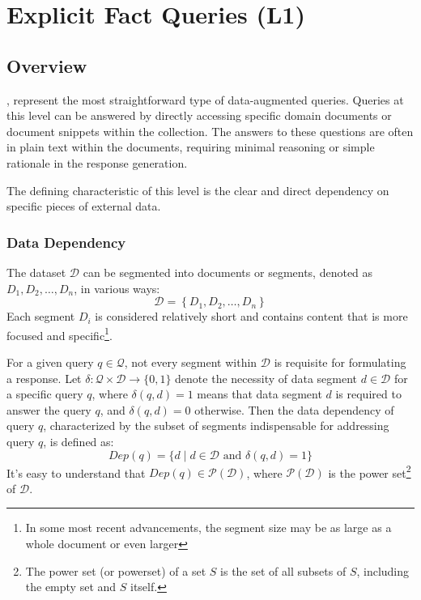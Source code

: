 \section{Explicit Fact Queries (L1)}

\subsection{Overview}

\MFUsentencecase{\firstlevel}, represent the most straightforward type of data-augmented queries. Queries at this level can be answered by directly accessing specific domain documents or document snippets within the collection. The answers to these questions are often in plain text within the documents, requiring minimal reasoning or simple rationale in the response generation.


The defining characteristic of this level is the clear and direct dependency on specific pieces of external data. 

\subsubsection{Data Dependency}

The dataset $\mathcal{D}$ can be segmented into documents or segments, denoted as $D_1, D_2, \ldots, D_n$, in various ways:
\begin{equation}
    \mathcal{D} = \left\{ D_1, D_2, \ldots, D_n \right\}
\end{equation}
Each segment $D_i$ is considered relatively short and contains content that is more focused and specific\footnote{In some most recent advancements, the segment size may be as large as a whole document or even larger}. 

For a given query \(q \in \mathcal{Q}\), not every segment within $\mathcal{D}$ is requisite for formulating a response. Let $\delta: \mathcal{Q} \times \mathcal{D} \rightarrow \{0,1\}$ denote the necessity of data segment \(d \in \mathcal{D}\) for a specific query \(q\), where $\delta(q,d) = 1$ means that data segment \(d\) is required to answer the query \(q\), and $\delta(q,d) = 0$ otherwise. Then the data dependency of query \(q\), characterized by the subset of segments indispensable for addressing query \(q\), is defined as:
\begin{equation}
    Dep(q) = \{d \mid d \in \mathcal{D} \text{ and } \delta(q,d) = 1\} 
\end{equation}
It's easy to understand that $Dep(q) \in \mathcal{P}(\mathcal{D})$, where $\mathcal{P}(\mathcal{D})$ is the power set\footnote{The power set (or powerset) of a set $S$ is the set of all subsets of $S$, including the empty set and $S$ itself.} of $\mathcal{D}$.

